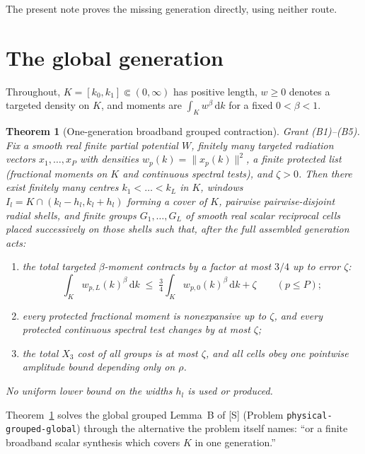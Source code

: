 \documentclass[11pt]{article}
\newtheorem{theorem}{Theorem}[section]
\theoremstyle{remark}
\theoremstyle{definition}
\newcommand{\dd}{\,\mathrm d}
\begin{document}
\noindent The present note proves the missing generation directly, using
neither route.

\section{The global generation}

Throughout, $K=[k_0,k_1]\Subset(0,\infty)$ has positive length,
$w\geq0$ denotes a targeted density on $K$, and moments are
$\int_K w^\beta\dd k$ for a fixed $0<\beta<1$.

\begin{theorem}[One-generation broadband grouped contraction]
\label{thm:one-generation}
Grant (B1)--(B5).  Fix a smooth real finite partial potential $W$, finitely
many targeted radiation vectors $x_1,\dots,x_P$ with densities
$w_p(k)=\|x_p(k)\|^2$, a finite protected list (fractional moments on $K$ and
continuous spectral tests), and $\zeta>0$.  Then there exist finitely many
centres $k_1<\dots<k_L$ in $K$, windows
$I_l=K\cap(k_l-h_l,k_l+h_l)$ forming a cover of $K$, pairwise pairwise-disjoint
radial shells, and finite groups $G_1,\dots,G_L$ of smooth real scalar
reciprocal cells placed successively on those shells such that, after the
full assembled generation acts:

\begin{enumerate}
 \item the total targeted $\beta$-moment contracts by a factor at most
       $3/4$ up to error $\zeta$:
       \begin{equation}
        \int_K w_{p,L}(k)^\beta\dd k
        \;\leq\;
        \tfrac34\int_K w_{p,0}(k)^\beta\dd k+\zeta
        \qquad(p\leq P);
        \label{eq:stage-contract}
       \end{equation}
 \item every protected fractional moment is nonexpansive up to $\zeta$, and
       every protected continuous spectral test changes by at most $\zeta$;
 \item the total $X_3$ cost of all groups is at most $\zeta$, and all cells
       obey one pointwise amplitude bound depending only on $\rho$.
\end{enumerate}
No uniform lower bound on the widths $h_l$ is used or produced.
\end{theorem}

Theorem~\ref{thm:one-generation} solves the global grouped Lemma~B of [S]
(Problem \texttt{physical-grouped-global}) through the alternative the
problem itself names: ``or a finite broadband scalar synthesis which covers
$K$ in one generation.''
\end{document}
